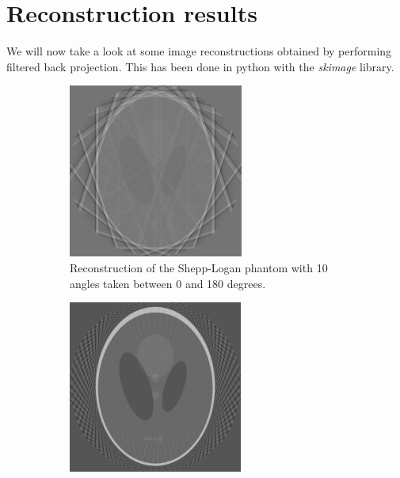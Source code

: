 \section{Reconstruction results}
We will now take a look at some image reconstructions obtained by performing filtered back projection. This has been done in python with the \textit{skimage} library.\\
\begin{figure}
	\centering
	\begin{subfigure}{0.48\linewidth}
		\centering
		\includegraphics[width=\linewidth]{Materials/recon10}
		\caption{Reconstruction of the Shepp-Logan phantom with 10 angles taken between 0 and 180 degrees.}
	\end{subfigure}
	\hfill
	\begin{subfigure}{0.48\linewidth}
		\centering
		\includegraphics[width=\linewidth]{Materials/recon45}

\end{subfigure}
\end{figure}
